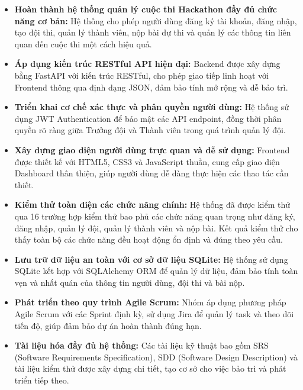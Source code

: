 ﻿\documentclass[12pt,a4paper]{report}
\begin{document}
\begin{itemize}
	\item \textbf{Hoàn thành hệ thống quản lý cuộc thi Hackathon đầy đủ chức năng cơ bản:} Hệ thống cho phép người dùng đăng ký tài khoản, đăng nhập, tạo đội thi, quản lý thành viên, nộp bài dự thi và quản lý các thông tin liên quan đến cuộc thi một cách hiệu quả.
	
	\item \textbf{Áp dụng kiến trúc RESTful API hiện đại:} Backend được xây dựng bằng FastAPI với kiến trúc RESTful, cho phép giao tiếp linh hoạt với Frontend thông qua định dạng JSON, đảm bảo tính mở rộng và dễ bảo trì.
	
	\item \textbf{Triển khai cơ chế xác thực và phân quyền người dùng:} Hệ thống sử dụng JWT Authentication để bảo mật các API endpoint, đồng thời phân quyền rõ ràng giữa Trưởng đội và Thành viên trong quá trình quản lý đội.
	
	\item \textbf{Xây dựng giao diện người dùng trực quan và dễ sử dụng:} Frontend được thiết kế với HTML5, CSS3 và JavaScript thuần, cung cấp giao diện Dashboard thân thiện, giúp người dùng dễ dàng thực hiện các thao tác cần thiết.
	
	\item \textbf{Kiểm thử toàn diện các chức năng chính:} Hệ thống đã được kiểm thử qua 16 trường hợp kiểm thử bao phủ các chức năng quan trọng như đăng ký, đăng nhập, quản lý đội, quản lý thành viên và nộp bài. Kết quả kiểm thử cho thấy toàn bộ các chức năng đều hoạt động ổn định và đúng theo yêu cầu.
	
	\item \textbf{Lưu trữ dữ liệu an toàn với cơ sở dữ liệu SQLite:} Hệ thống sử dụng SQLite kết hợp với SQLAlchemy ORM để quản lý dữ liệu, đảm bảo tính toàn vẹn và nhất quán của thông tin người dùng, đội thi và bài nộp.
	
	\item \textbf{Phát triển theo quy trình Agile Scrum:} Nhóm áp dụng phương pháp Agile Scrum với các Sprint định kỳ, sử dụng Jira để quản lý task và theo dõi tiến độ, giúp đảm bảo dự án hoàn thành đúng hạn.
	
	\item \textbf{Tài liệu hóa đầy đủ hệ thống:} Các tài liệu kỹ thuật bao gồm SRS (Software Requirements Specification), SDD (Software Design Description) và tài liệu kiểm thử được xây dựng chi tiết, tạo cơ sở cho việc bảo trì và phát triển tiếp theo.
\end{itemize}
\end{document}
